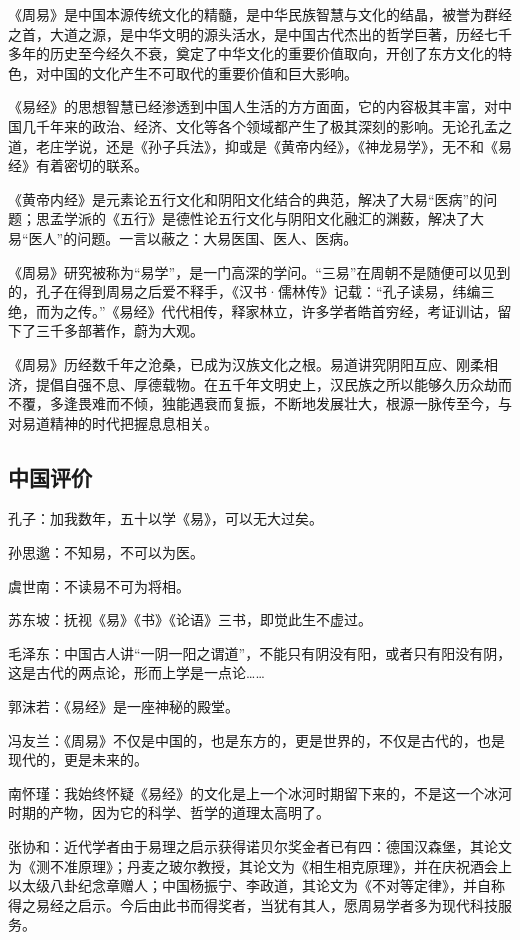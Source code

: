 \documentclass[12pt,UTF8]{ctexbook}
\begin{document}
《周易》是中国本源传统文化的精髓，是中华民族智慧与文化的结晶，被誉为群经之首，大道之源，是中华文明的源头活水，是中国古代杰出的哲学巨著，历经七千多年的历史至今经久不衰，奠定了中华文化的重要价值取向，开创了东方文化的特色，对中国的文化产生不可取代的重要价值和巨大影响。

《易经》的思想智慧已经渗透到中国人生活的方方面面，它的内容极其丰富，对中国几千年来的政治、经济、文化等各个领域都产生了极其深刻的影响。无论孔孟之道，老庄学说，还是《孙子兵法》，抑或是《黄帝内经》，《神龙易学》，无不和《易经》有着密切的联系。

《黄帝内经》是元素论五行文化和阴阳文化结合的典范，解决了大易“医病”的问题；思孟学派的《五行》是德性论五行文化与阴阳文化融汇的渊薮，解决了大易“医人”的问题。一言以蔽之：大易医国、医人、医病。

《周易》研究被称为“易学”，是一门高深的学问。“三易”在周朝不是随便可以见到的，孔子在得到周易之后爱不释手，《汉书·儒林传》记载：“孔子读易，纬编三绝，而为之传。”《易经》代代相传，释家林立，许多学者皓首穷经，考证训诂，留下了三千多部著作，蔚为大观。

《周易》历经数千年之沧桑，已成为汉族文化之根。易道讲究阴阳互应、刚柔相济，提倡自强不息、厚德载物。在五千年文明史上，汉民族之所以能够久历众劫而不覆，多逢畏难而不倾，独能遇衰而复振，不断地发展壮大，根源一脉传至今，与对易道精神的时代把握息息相关。

\subsection{中国评价}
孔子：加我数年，五十以学《易》，可以无大过矣。

孙思邈：不知易，不可以为医。

虞世南：不读易不可为将相。

苏东坡：抚视《易》《书》《论语》三书，即觉此生不虚过。

毛泽东：中国古人讲“一阴一阳之谓道”，不能只有阴没有阳，或者只有阳没有阴，这是古代的两点论，形而上学是一点论……

郭沫若：《易经》是一座神秘的殿堂。

冯友兰：《周易》不仅是中国的，也是东方的，更是世界的，不仅是古代的，也是现代的，更是未来的。

南怀瑾：我始终怀疑《易经》的文化是上一个冰河时期留下来的，不是这一个冰河时期的产物，因为它的科学、哲学的道理太高明了。

张协和：近代学者由于易理之启示获得诺贝尔奖金者已有四：德国汉森堡，其论文为《测不准原理》；丹麦之玻尔教授，其论文为《相生相克原理》，并在庆祝酒会上以太级八卦纪念章赠人；中国杨振宁、李政道，其论文为《不对等定律》，并自称得之易经之启示。今后由此书而得奖者，当犹有其人，愿周易学者多为现代科技服务。
\end{document}
